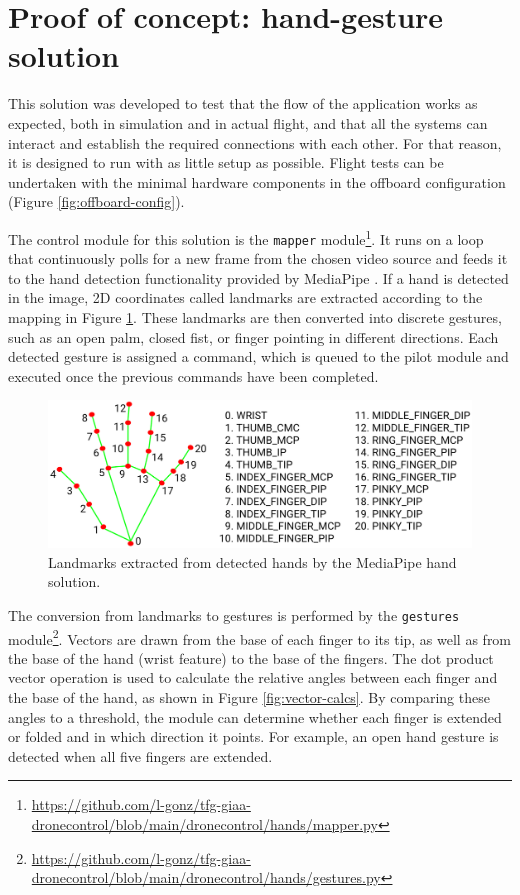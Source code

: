 \section{Proof of concept: hand-gesture solution}
\label{sec:hands}
This solution was developed to test that the flow of the application works as expected, both in simulation and in actual flight, and that all the systems can interact and establish the required connections with each other.
For that reason, it is designed to run with as little setup as possible. Flight tests can be undertaken with the minimal hardware components in the offboard configuration (Figure \ref{fig:offboard-config}).

The control module for this solution is the \texttt{mapper} module\footnote{\url{https://github.com/l-gonz/tfg-giaa-dronecontrol/blob/main/dronecontrol/hands/mapper.py}}.
It runs on a loop that continuously polls for a new frame from the chosen video source and feeds it to the hand detection functionality provided by MediaPipe \cite{mp-hands-paper}.
If a hand is detected in the image, 2D coordinates called landmarks are extracted according to the mapping in Figure \ref{fig:hand-landmarks}.
These landmarks are then converted into discrete gestures, such as an open palm, closed fist, or finger pointing in different directions. Each detected gesture is assigned a command, which is queued to the pilot module and executed once the previous commands have been completed.

\begin{figure}
  \centering
  \includegraphics[width=\textwidth, keepaspectratio]{img/hand_landmarks.png}
  \caption{Landmarks extracted from detected hands by the MediaPipe hand solution.}
  \label{fig:hand-landmarks}
\end{figure}

The conversion from landmarks to gestures is performed by the \texttt{gestures} module\footnote{\url{https://github.com/l-gonz/tfg-giaa-dronecontrol/blob/main/dronecontrol/hands/gestures.py}}. Vectors are drawn from the base of each finger to its tip, as well as from the base of the hand (wrist feature) to the base of the fingers. The dot product vector operation is used to calculate the relative angles between each finger and the base of the hand, as shown in Figure \ref{fig:vector-calcs}. By comparing these angles to a threshold, the module can determine whether each finger is extended or folded and in which direction it points. For example, an open hand gesture is detected when all five fingers are extended.

